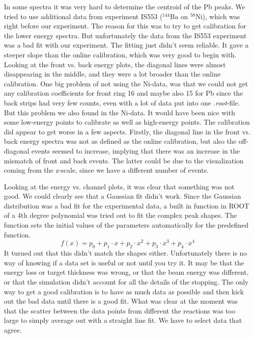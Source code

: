 \documentclass[twoside,english]{uiofysmaster/uiofysmaster}
\begin{document}
In some spectra it was very hard to determine the centroid of the Pb peaks. 
We tried to use additional data from experiment IS553 ($^{144}$Ba on $^{58}$Ni), which was right before our experiment. 
The reason for this was to try to get calibration for the lower energy spectra. 
But unfortunately the data from the IS553 experiment was a bad fit with our experiment. 
The fitting just didn't seem reliable.
It gave a steeper slope than the online calibration, which was very good to begin with. 
Looking at the front vs. back energy plots, the diagonal lines were almost disappearing in the middle, and they were a lot broader than the online calibration. 
One big problem of not using the Ni-data, was that we could not get any calibration coefficients for front ring 16 and maybe also 15 for Pb since the back strips had very few counts, even with a lot of data put into one \textit{.root}-file. 
But this problem we also found in the Ni-data.
It would have been nice with some low-energy points to calibrate as well as high-energy points. 
The calibration did appear to get worse in a few aspects. 
Firstly, the diagonal line in the front vs. back energy spectra was not as defined as the online calibration, but also the off-diagonal events seemed to increase, implying that there was an increase in the mismatch of front and back events. 
The latter could be due to the visualization coming from the z-scale, since we have a different number of events. 

Looking at the energy vs. channel plots, it was clear that something was not good.
We could clearly see that a Gaussian fit didn't work. 
Since the Gaussian distribution was a bad fit for the experimental data, a built in function in ROOT of a 4th degree polynomial was tried out to fit the complex peak shapes. The function sets the initial values of the parameters automatically for the predefined function.
\begin{equation}
	f(x) = p_0 + p_1 \cdot x + p_2 \cdot x^2 + p_3 \cdot x^3 + p_4 \cdot x^4
\end{equation}
It turned out that this didn't match the shapes either. 
Unfortunately there is no way of knowing if a data set is useful or not until you try it. 
It may be that the energy loss or target thickness was wrong, or that the beam energy was different, or that the simulation didn't account for all the details of the stopping. 
The only way to get a good calibration is to have as much data as possible and then kick out the bad data until there is a good fit. 
What was clear at the moment was that the scatter between the data points from different the reactions was too large to simply average out with a straight line fit. 
We have to select data that agree.
\end{document}
